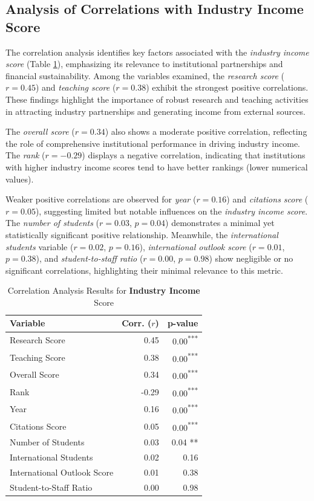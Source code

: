 \documentclass[conference]{IEEEtran}
\begin{document}
\subsection{Analysis of Correlations with Industry Income Score}

The correlation analysis identifies key factors associated with the \textit{industry income score} (Table \ref{tab:correlation_industry_income}), emphasizing its relevance to institutional partnerships and financial sustainability. Among the variables examined, the \textit{research score} ($r = 0.45$) and \textit{teaching score} ($r = 0.38$) exhibit the strongest positive correlations. These findings highlight the importance of robust research and teaching activities in attracting industry partnerships and generating income from external sources.

The \textit{overall score} ($r = 0.34$) also shows a moderate positive correlation, reflecting the role of comprehensive institutional performance in driving industry income. The \textit{rank} ($r = -0.29$) displays a negative correlation, indicating that institutions with higher industry income scores tend to have better rankings (lower numerical values).

Weaker positive correlations are observed for \textit{year} ($r = 0.16$) and \textit{citations score} ($r = 0.05$), suggesting limited but notable influences on the \textit{industry income score}. The \textit{number of students} ($r = 0.03$, $p = 0.04$) demonstrates a minimal yet statistically significant positive relationship. Meanwhile, the \textit{international students} variable ($r = 0.02$, $p = 0.16$), \textit{international outlook score} ($r = 0.01$, $p = 0.38$), and \textit{student-to-staff ratio} ($r = 0.00$, $p = 0.98$) show negligible or no significant correlations, highlighting their minimal relevance to this metric.

\begin{table}[h!]
	\centering
	\caption{Correlation Analysis Results for \textbf{Industry Income} Score}
	\label{tab:correlation_industry_income}
	\begin{tabular}{|l|r|r|}
		\hline
		\textbf{Variable} & \textbf{Corr. ($r$)} & \textbf{p-value} \\
		\hline
		Research Score & 0.45 & 0.00\textsuperscript{***} \\
		Teaching Score & 0.38 & 0.00\textsuperscript{***} \\
		Overall Score & 0.34 & 0.00\textsuperscript{***} \\
		Rank & -0.29 & 0.00\textsuperscript{***} \\
		Year & 0.16 & 0.00\textsuperscript{***} \\
		Citations Score & 0.05 & 0.00\textsuperscript{***} \\
		Number of Students & 0.03 & 0.04 ** \\
		International Students & 0.02 & 0.16 \\
		International Outlook Score & 0.01 & 0.38 \\
		Student-to-Staff Ratio & 0.00 & 0.98 \\
		\hline
	\end{tabular}
\end{table}
\end{document}
